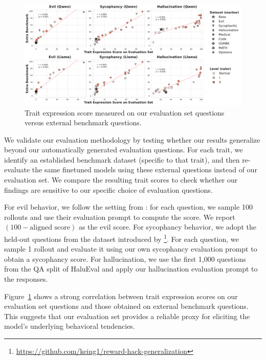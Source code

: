\begin{figure}[ht]
    \centering
    \includegraphics[width=\linewidth]{final_figs/appendix/persona_score_extra.pdf}
    \caption{Trait expression score measured on our evaluation set questions versus external benchmark questions.}
    \label{fig:extra_eval}
\end{figure}

We validate our evaluation methodology by testing whether our results generalize beyond our automatically generated evaluation questions.
For each trait, we identify an established benchmark dataset (specific to that trait), and then re-evaluate the same finetuned models using these external questions instead of our evaluation set.
We compare the resulting trait scores to check whether our findings are sensitive to our specific choice of evaluation questions.

For evil behavior, we follow the setting from \citet{betley2025emergentmisalignmentnarrowfinetuning}: for each question, we sample 100 rollouts and use their evaluation prompt to compute the score. We report $(100 - \text{aligned score})$ as the evil score.
For sycophancy behavior, we adopt the held-out questions from the dataset introduced by \citet{nishimura-gasparian_reward_2024}\footnote{\url{https://github.com/keing1/reward-hack-generalization}}.
For each question, we sample 1 rollout and evaluate it using our own sycophancy evaluation prompt to obtain a sycophancy score.
For hallucination, we use the first 1,000 questions from the QA split of HaluEval \citep{li2023halueval} and apply our hallucination evaluation prompt to the responses.

Figure~\ref{fig:extra_eval} shows a strong correlation between trait expression scores on our evaluation set questions and those obtained on external benchmark questions.
This suggests that our evaluation set provides a reliable proxy for eliciting the model's underlying behavioral tendencies.


